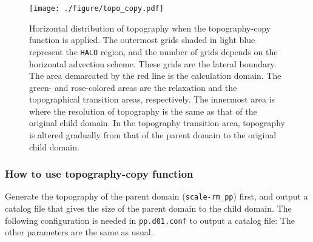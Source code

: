 \begin{figure}[tbh]
\begin{center}
  \texttt{[image: ./figure/topo\_copy.pdf]}\\
  \caption{Horizontal distribution of topography when the topography-copy function is applied.
    The outermost grids shaded in light blue represent the \texttt{HALO} region, and the number of grids depends on
    the horizontal advection scheme.
    These grids are the lateral boundary. The area demarcated by the red line is the calculation domain.
    The green- and rose-colored areas are the relaxation and the topographical transition areas, respectively.
    The innermost area is where the resolution of topography is the same as that of the original child domain.
    In the topography transition area, topography is altered gradually from that of
    the parent domain to the original child domain.
}
  \label{fig_topocopy}
\end{center}
\end{figure}



\subsubsection{How to use topography-copy function}

Generate the topography of the parent domain (\verb|scale-rm_pp|) first, and output a catalog file that gives the size of the parent domain to the child domain. The following configuration is needed in \verb|pp.d01.conf| to output a catalog file:
The other parameters are the same as usual.

